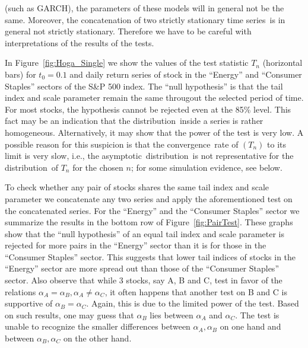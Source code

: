 \documentclass[11pt,a4]{amsart}
\newcommand{\asy}{asymptotic}
\newcommand{\ts}{time series}
\newcommand{\con}{convergence}
\newcommand{\ds}{distribution}
\newcommand{\1}{{\mathbf 1}}
\begin{document}
(such as GARCH), the parameters of these models will in general not be the same. Moreover, the concatenation
of two strictly stationary \ts\ is in general not strictly stationary. Therefore we have to be careful
with interpretations of the results of the tests.
\par 
In Figure~\ref{fig:Hoga_Single} we show the values of the test statistic $T_n$ (horizontal bars)
for $t_0=0.1$ and daily return series of stock in the ``Energy'' and ``Consumer Staples'' sectors of the S\&P
500 index. The ``null hypothesis'' is that the tail index and scale parameter remain the
same througout the selected period of time. For most stocks, the hypothesis cannot be rejected even at the 85\% level.
This fact may be an indication that the \ds\ inside a series is rather homogeneous.
Alternatively, it may show that the power of the test is very low. A possible reason for this suspicion is that the \con\ rate
of $(T_n)$ to its limit is very slow, i.e., the \asy\ \ds\ is not representative for the \ds\ of $T_n$ for the chosen $n$; for some
simulation evidence, see below.
\par
To check whether any pair of stocks shares the same tail index and scale parameter we concatenate
any two series and apply the aforementioned test on the concatenated series. For the ``Energy'' and the
``Consumer Staples'' sector we summarize the results in the bottom row of Figure~\ref{fig:PairTest}.
These graphs show that the ``null
hypothesis'' of an equal tail index and scale parameter is rejected for more pairs in the
``Energy'' sector than it is for those in the ``Consumer Staples''
sector. This suggests that lower tail indices of stocks in the
``Energy'' sector are more spread out than those of the ``Consumer
Staples'' sector. Also observe that while 3 stocks, say A, B and C, test in favor of
the relations $\alpha_A = \alpha_B, \alpha_A \neq \alpha_C$, it often
happens that another test on B and C is supportive of $\alpha_B = \alpha_C$. Again,
this is due to the limited power of the test. Based
on such results, one may guess that $\alpha_B$ lies between $\alpha_A$ and
$\alpha_C$. The test is unable to recognize the smaller differences
between $\alpha_A, \alpha_B$ on one hand and between $\alpha_B, \alpha_C$ on the other hand.
\end{document}
